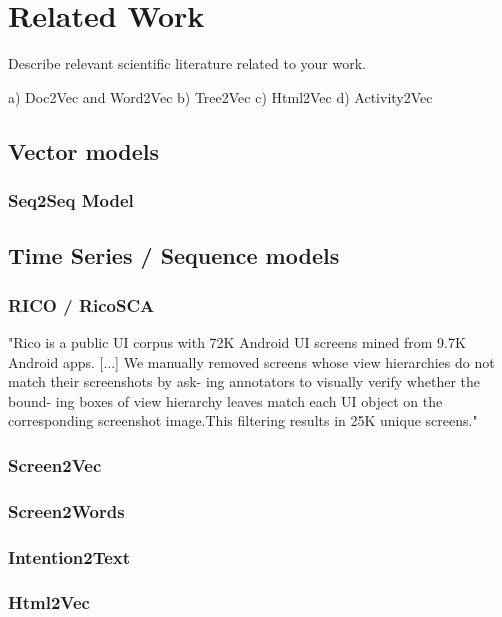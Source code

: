 \chapter{Related Work}

Describe relevant scientific literature related to your work.


 a) Doc2Vec and Word2Vec %
 b) Tree2Vec
 c) Html2Vec
 d) Activity2Vec
 
\section{Vector models}

\subsection{Seq2Seq Model}

\section{Time Series / Sequence models}

\subsection{RICO / RicoSCA}

"Rico is a public UI corpus with 72K Android UI
screens mined from 9.7K Android apps. [...]
We manually removed screens whose view
hierarchies do not match their screenshots by ask-
ing annotators to visually verify whether the bound-
ing boxes of view hierarchy leaves match each UI
object on the corresponding screenshot image.This filtering results in 25K unique screens."

\subsection{Screen2Vec}

\subsection{Screen2Words}

\subsection{Intention2Text}

\subsection{Html2Vec}
